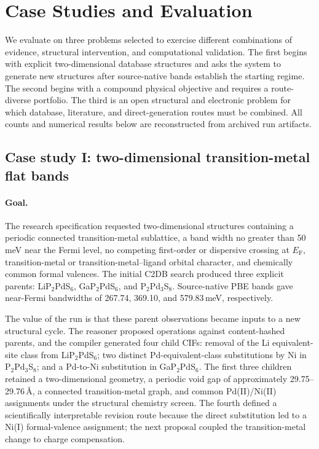 \section{Case Studies and Evaluation}
\label{sec:experiments}

We evaluate \system on three problems selected to exercise different combinations of evidence, structural intervention, and computational validation.  The first begins with explicit two-dimensional database structures and asks the system to generate new structures after source-native bands establish the starting regime.  The second begins with a compound physical objective and requires a route-diverse portfolio.  The third is an open structural and electronic problem for which database, literature, and direct-generation routes must be combined.  All counts and numerical results below are reconstructed from archived run artifacts.

\subsection{Case study I: two-dimensional transition-metal flat bands}
\label{sec:case-flatband}

\paragraph{Goal.}
The research specification requested two-dimensional structures containing a periodic connected transition-metal sublattice, a band width no greater than 50\,meV near the Fermi level, no competing first-order or dispersive crossing at $E_\mathrm{F}$, transition-metal or transition-metal--ligand orbital character, and chemically common formal valences.  The initial C2DB search produced three explicit parents: LiP$_2$PdS$_6$, GaP$_2$PdS$_6$, and P$_2$Pd$_3$S$_8$.  Source-native PBE bands gave near-Fermi bandwidths of 267.74, 369.10, and 579.83\,meV, respectively.

The value of the run is that these parent observations became inputs to a new structural cycle.  The reasoner proposed operations against content-hashed parents, and the compiler generated four child CIFs: removal of the Li equivalent-site class from LiP$_2$PdS$_6$; two distinct Pd-equivalent-class substitutions by Ni in P$_2$Pd$_3$S$_8$; and a Pd-to-Ni substitution in GaP$_2$PdS$_6$.  The first three children retained a two-dimensional geometry, a periodic void gap of approximately 29.75--29.76\,\AA, a connected transition-metal graph, and common Pd(II)/Ni(II) assignments under the structural chemistry screen.  The fourth defined a scientifically interpretable revision route because the direct substitution led to a Ni(I) formal-valence assignment; the next proposal coupled the transition-metal change to charge compensation.

